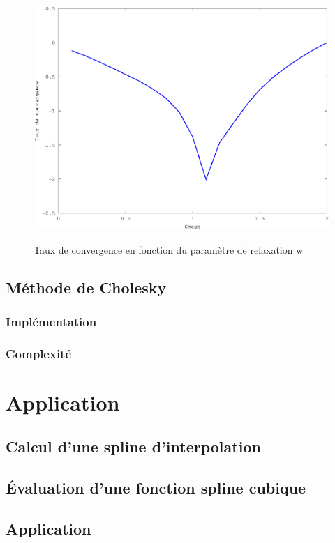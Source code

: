 \documentclass[a4paper,11pt]{article}
\begin{document}
\begin{figure}[h!]
  \begin{centering}
    \includegraphics[scale=0.5]{../relaxation_conv}
    \label{rspro2}
    \par\end{centering}
  \caption{Taux de convergence en fonction du paramètre de relaxation w}
  \label{fig:jacobi-conv}
\end{figure}

\subsection{Méthode de Cholesky}
\subsubsection{Implémentation}
\subsubsection{Complexité}

\section{Application}
\subsection{Calcul d'une spline d'interpolation}
\subsection{Évaluation d'une fonction spline cubique}
\subsection{Application}
\end{document}
